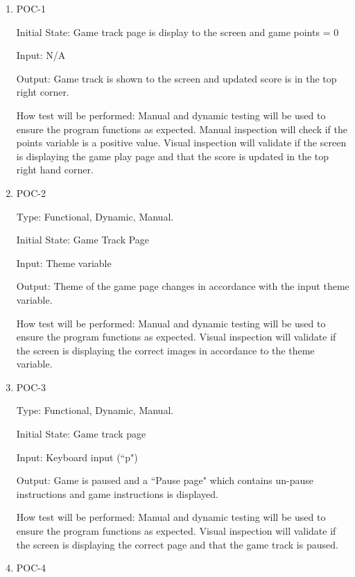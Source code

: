 \documentclass[12pt, titlepage]{article}
\begin{document}
	\begin{enumerate}
		
		\item{POC-1\\}
		
		Initial State: Game track page is display to the screen and game points = 0
		
		Input: N/A
		
		Output: Game track is shown to the screen and updated score is in the top right corner. 
		
		How test will be performed: Manual and dynamic testing will be used to ensure the program functions as expected. Manual inspection will check if the points variable is a positive value. Visual inspection will validate if the screen is displaying the game play page and that the score is updated in the top right hand corner. 
		
		\item{POC-2\\}
		
		Type: Functional, Dynamic, Manual.
		
		Initial State: Game Track Page
		
		Input: Theme variable
		
		Output: Theme of the game page changes in accordance with the input theme variable.
		
		How test will be performed: Manual and dynamic testing will be used to ensure the program functions as expected. Visual inspection will validate if the screen is displaying the correct images in accordance to the theme variable.   
		
		\item{POC-3\\}
		
		Type: Functional, Dynamic, Manual.
		
		Initial State: Game track page
		
		Input: Keyboard input (``p")
		
		Output: Game is paused and a ``Pause page" which contains un-pause instructions and game instructions is displayed.
		
		How test will be performed: Manual and dynamic testing will be used to ensure the program functions as expected. Visual inspection will validate if the screen is displaying the correct page and that the game track is paused.
		
		\item{POC-4\\}
		

\end{enumerate}
\end{document}
